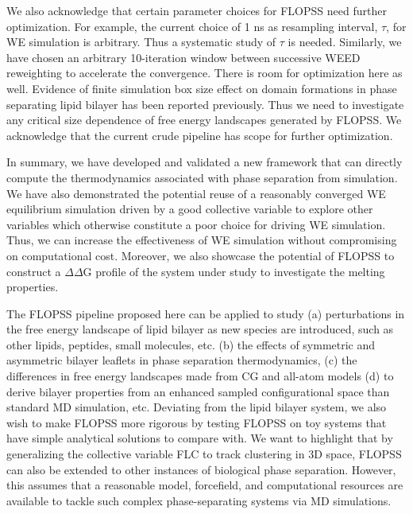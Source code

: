 \documentclass{biophys-new}
\begin{document}
We also acknowledge that certain parameter choices for FLOPSS need further optimization.
For example, the current choice of 1 ns as resampling interval, $\tau$, for WE simulation is arbitrary.
Thus a systematic study of $\tau$ is needed.
Similarly, we have chosen an arbitrary 10-iteration window between successive WEED reweighting to accelerate the convergence.  
There is room for optimization here as well.
Evidence of finite simulation box size effect on domain formations in phase separating lipid bilayer has been reported previously\cite{Pantelopulos2017}.
Thus we need to investigate any critical size dependence of free energy landscapes generated by FLOPSS.
We acknowledge that the current crude pipeline has scope for further optimization. 

In summary, we have developed and validated a new framework that can directly compute the thermodynamics associated with phase separation from simulation.
We have also demonstrated the potential reuse of a reasonably converged WE equilibrium simulation driven by a good collective variable to explore other variables which otherwise constitute a poor choice for driving WE simulation.
Thus, we can increase the effectiveness of WE simulation without compromising on computational cost.
Moreover, we also showcase the potential of FLOPSS to construct a $\Delta\Delta$G profile of the system under study to investigate the melting properties.

The FLOPSS pipeline proposed here can be applied to study (a) perturbations in the free energy landscape of lipid bilayer as new species are introduced, such as other lipids, peptides, small molecules, etc.
(b) the effects of symmetric and asymmetric bilayer leaflets in phase separation thermodynamics,
(c) the differences in free energy landscapes made from CG and all-atom models 
(d) to derive bilayer properties from an enhanced sampled configurational space than standard MD simulation, etc. 
Deviating from the lipid bilayer system, we also wish to make FLOPSS more rigorous by testing FLOPSS on toy systems that have simple analytical solutions to compare with. 
We want to highlight that by generalizing the collective variable FLC to track clustering in 3D space, FLOPSS can also be extended to other instances of biological phase separation.
However, this assumes that a reasonable model, forcefield, and computational resources are available to tackle such complex phase-separating systems via MD simulations.





\end{document}
